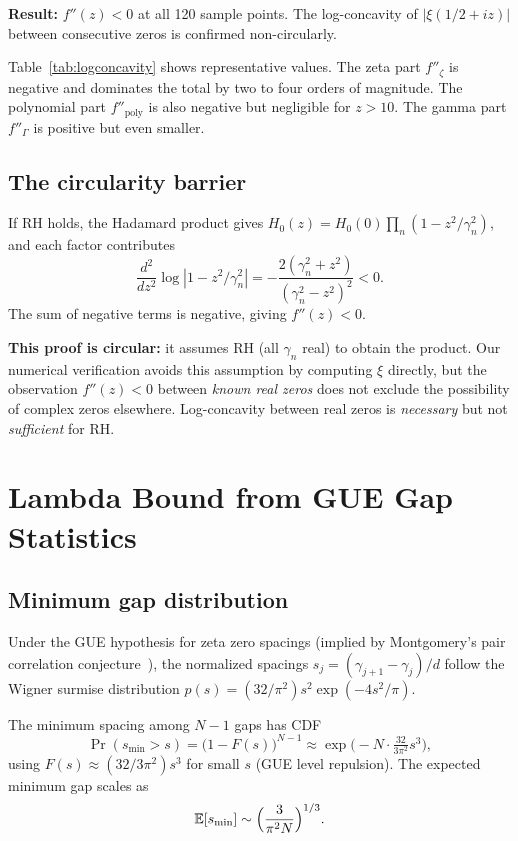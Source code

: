 \documentclass[11pt,a4paper]{article}
\begin{document}
\textbf{Result:} $f''(z) < 0$ at all 120 sample points. The
log-concavity of $|\xi(1/2+iz)|$ between consecutive zeros is
confirmed non-circularly.

Table~\ref{tab:logconcavity} shows representative values. The zeta
part $f''_\zeta$ is negative and dominates the total by two to four
orders of magnitude. The polynomial part $f''_{\mathrm{poly}}$ is
also negative but negligible for $z > 10$. The gamma part
$f''_\Gamma$ is positive but even smaller.

\subsection{The circularity barrier}

If RH holds, the Hadamard product gives
$H_0(z) = H_0(0)\prod_n(1 - z^2/\gamma_n^2)$, and each factor
contributes
\[
  \frac{d^2}{dz^2}\log|1 - z^2/\gamma_n^2|
  = -\frac{2(\gamma_n^2 + z^2)}{(\gamma_n^2 - z^2)^2} < 0.
\]
The sum of negative terms is negative, giving $f''(z) < 0$.

\textbf{This proof is circular:} it assumes RH (all $\gamma_n$ real)
to obtain the product. Our numerical verification avoids this
assumption by computing $\xi$ directly, but the observation $f''(z) <
0$ between \emph{known real zeros} does not exclude the possibility
of complex zeros elsewhere. Log-concavity between real zeros is
\emph{necessary} but not \emph{sufficient} for RH.

\section{Lambda Bound from GUE Gap Statistics}\label{sec:lambda}

\subsection{Minimum gap distribution}

Under the GUE hypothesis for zeta zero spacings (implied by
Montgomery's pair correlation conjecture~\cite{montgomery1973}), the
normalized spacings $s_j = (\gamma_{j+1} - \gamma_j)/d$ follow the
Wigner surmise distribution
$p(s) = (32/\pi^2)s^2\exp(-4s^2/\pi)$.

The minimum spacing among $N-1$ gaps has CDF
\[
  \Pr(s_{\min} > s) = \bigl(1 - F(s)\bigr)^{N-1}
  \approx \exp\bigl(-N \cdot \tfrac{32}{3\pi^2}s^3\bigr),
\]
using $F(s) \approx (32/3\pi^2)s^3$ for small $s$ (GUE level
repulsion). The expected minimum gap scales as
\begin{equation}\label{eq:gmin}
  \mathbb{E}[s_{\min}] \sim \Bigl(\frac{3}{\pi^2 N}\Bigr)^{1/3}.
\end{equation}
\end{document}

